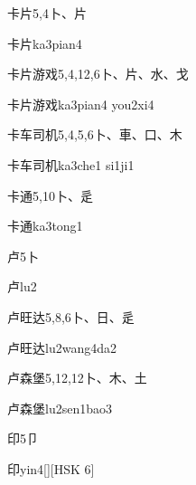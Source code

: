 \begin{Entry}{卡片}{5,4}{⼘、⽚}
  \begin{Phonetics}{卡片}{ka3pian4}
  \end{Phonetics}
\end{Entry}

\begin{Entry}{卡片游戏}{5,4,12,6}{⼘、⽚、⽔、⼽}
  \begin{Phonetics}{卡片游戏}{ka3pian4 you2xi4}
  \end{Phonetics}
\end{Entry}

\begin{Entry}{卡车司机}{5,4,5,6}{⼘、⾞、⼝、⽊}
  \begin{Phonetics}{卡车司机}{ka3che1 si1ji1}
  \end{Phonetics}
\end{Entry}

\begin{Entry}{卡通}{5,10}{⼘、⾡}
  \begin{Phonetics}{卡通}{ka3tong1}
  \end{Phonetics}
\end{Entry}

\begin{Entry}{卢}{5}{⼘}
  \begin{Phonetics}{卢}{lu2}
  \end{Phonetics}
\end{Entry}

\begin{Entry}{卢旺达}{5,8,6}{⼘、⽇、⾡}
  \begin{Phonetics}{卢旺达}{lu2wang4da2}
  \end{Phonetics}
\end{Entry}

\begin{Entry}{卢森堡}{5,12,12}{⼘、⽊、⼟}
  \begin{Phonetics}{卢森堡}{lu2sen1bao3}
  \end{Phonetics}
\end{Entry}

\begin{Entry}{印}{5}{⼙}
  \begin{Phonetics}{印}{yin4}[][HSK 6]
  \end{Phonetics}
\end{Entry}

